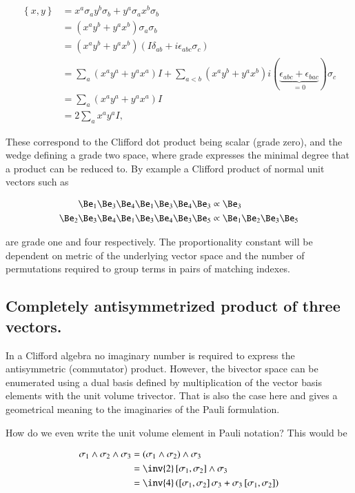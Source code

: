 \documentclass{article}
\newcommand{\symmetric}[2]{{\left\{{#1},{#2}\right\}}}
\newcommand{\antisymmetric}[2]{\left[{#1},{#2}\right]}
\begin{document}
\begin{align*}
\symmetric{x}{y} 
&= x^a \sigma_a y^b \sigma_b + y^a \sigma_a x^b \sigma_b \\
&= (x^a y^b + y^a x^b) \sigma_a \sigma_b \\
&= (x^a y^b + y^a x^b) ( I \delta_{a b} + i \epsilon_{a b c} \sigma_c) \\
&= \sum_a (x^a y^a + y^a x^a) I  
+\sum_{a<b}(x^a y^b + y^a x^b) i (\underbrace{\epsilon_{a b c} + \epsilon_{b a c}}_{=0}) \sigma_c \\
&= \sum_a (x^a y^a + y^a x^a) I \\
&= 2 \sum_a x^a y^a I,
\end{align*}

These correspond to the Clifford dot product being scalar (grade zero), and the wedge defining a grade two space, where grade expresses the minimal degree that a product can be reduced to.  By example a Clifford product of normal unit vectors such as

\begin{align*}
\Be_1 \Be_3 \Be_4 \Be_1 \Be_3 \Be_4 \Be_3 &\propto \Be_3 \\
\Be_2 \Be_3 \Be_4 \Be_1 \Be_3 \Be_4 \Be_3 \Be_5 &\propto \Be_1 \Be_2 \Be_3 \Be_5
\end{align*}

are grade one and four respectively.  The proportionality constant will be dependent on metric of the underlying vector space and the number of permutations required to group terms in pairs of matching indexes.

\subsection{ Completely antisymmetrized product of three vectors. }

In a Clifford algebra no imaginary number is required to express the antisymmetric (commutator) product.  However, the bivector space can be enumerated using a dual basis defined by multiplication of the vector basis elements with the unit volume trivector.  That is also the case here and gives a geometrical meaning to the imaginaries of the Pauli formulation.

How do we even write the unit volume element in Pauli notation?  This would be

\begin{align*}
\sigma_1 \wedge \sigma_2 \wedge \sigma_3 
&= (\sigma_1 \wedge \sigma_2) \wedge \sigma_3 \\
&= \inv{2} \antisymmetric{\sigma_1}{\sigma_2} \wedge \sigma_3 \\
&= \inv{4} \left( \antisymmetric{\sigma_1}{\sigma_2} \sigma_3 + \sigma_3 \antisymmetric{\sigma_1}{\sigma_2} \right) \\
\end{align*}
\end{document}
